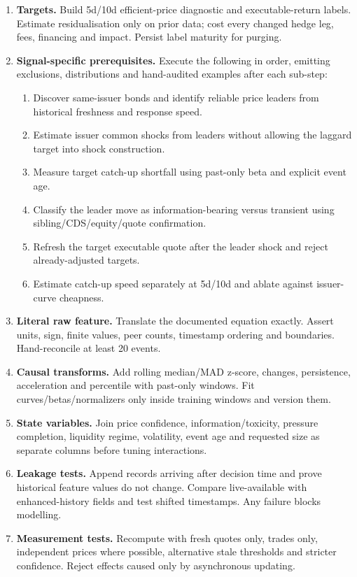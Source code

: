 \documentclass[10pt]{article}
\begin{document}
\begin{enumerate}[leftmargin=2em,label=\textbf{A\arabic*.}]
\item \textbf{Targets.} Build 5d/10d efficient-price diagnostic and executable-return labels. Estimate residualisation only on prior data; cost every changed hedge leg, fees, financing and impact. Persist label maturity for purging.
\item \textbf{Signal-specific prerequisites.} Execute the following in order, emitting exclusions, distributions and hand-audited examples after each sub-step:
\begin{enumerate}[label=\alph*)]
\item Discover same-issuer bonds and identify reliable price leaders from historical freshness and response speed.
\item Estimate issuer common shocks from leaders without allowing the laggard target into shock construction.
\item Measure target catch-up shortfall using past-only beta and explicit event age.
\item Classify the leader move as information-bearing versus transient using sibling/CDS/equity/quote confirmation.
\item Refresh the target executable quote after the leader shock and reject already-adjusted targets.
\item Estimate catch-up speed separately at 5d/10d and ablate against issuer-curve cheapness.
\end{enumerate}
\item \textbf{Literal raw feature.} Translate the documented equation exactly. Assert units, sign, finite values, peer counts, timestamp ordering and boundaries. Hand-reconcile at least 20 events.
\item \textbf{Causal transforms.} Add rolling median/MAD z-score, changes, persistence, acceleration and percentile with past-only windows. Fit curves/betas/normalizers only inside training windows and version them.
\item \textbf{State variables.} Join price confidence, information/toxicity, pressure completion, liquidity regime, volatility, event age and requested size as separate columns before tuning interactions.
\item \textbf{Leakage tests.} Append records arriving after decision time and prove historical feature values do not change. Compare live-available with enhanced-history fields and test shifted timestamps. Any failure blocks modelling.
\item \textbf{Measurement tests.} Recompute with fresh quotes only, trades only, independent prices where possible, alternative stale thresholds and stricter confidence. Reject effects caused only by asynchronous updating.

\end{enumerate}
\end{document}
